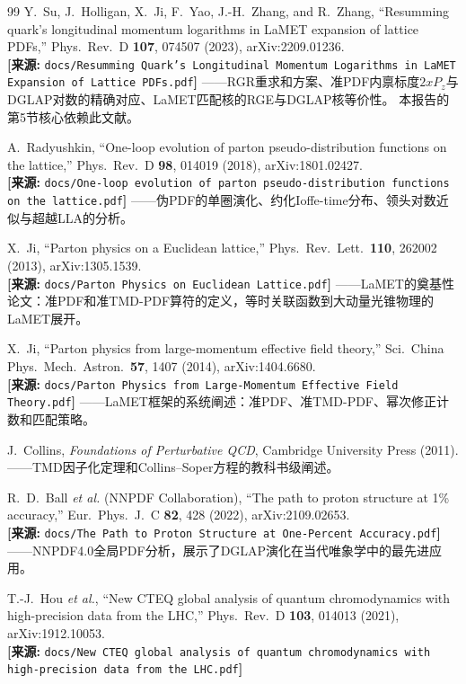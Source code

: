 \documentclass[12pt,a4paper]{ctexart}
\theoremstyle{definition}
\begin{document}
\begin{thebibliography}{99}
Y.~Su, J.~Holligan, X.~Ji, F.~Yao, J.-H.~Zhang, and R.~Zhang,
``Resumming quark's longitudinal momentum logarithms in LaMET expansion of lattice PDFs,''
Phys.\ Rev.\ D \textbf{107}, 074507 (2023), arXiv:2209.01236.
\\\textbf{[来源:} \texttt{docs/Resumming Quark's Longitudinal Momentum Logarithms in LaMET Expansion of Lattice PDFs.pdf}\textbf{]}
——RGR重求和方案、准PDF内禀标度$2xP_z$与DGLAP对数的精确对应、LaMET匹配核的RGE与DGLAP核等价性。
本报告的第5节核心依赖此文献。

A.~Radyushkin,
``One-loop evolution of parton pseudo-distribution functions on the lattice,''
Phys.\ Rev.\ D \textbf{98}, 014019 (2018), arXiv:1801.02427.
\\\textbf{[来源:} \texttt{docs/One-loop evolution of parton pseudo-distribution functions on the lattice.pdf}\textbf{]}
——伪PDF的单圈演化、约化Ioffe-time分布、领头对数近似与超越LLA的分析。

X.~Ji,
``Parton physics on a Euclidean lattice,''
Phys.\ Rev.\ Lett.\ \textbf{110}, 262002 (2013), arXiv:1305.1539.
\\\textbf{[来源:} \texttt{docs/Parton Physics on Euclidean Lattice.pdf}\textbf{]}
——LaMET的奠基性论文：准PDF和准TMD-PDF算符的定义，等时关联函数到大动量光锥物理的LaMET展开。

X.~Ji,
``Parton physics from large-momentum effective field theory,''
Sci.\ China Phys.\ Mech.\ Astron.\ \textbf{57}, 1407 (2014), arXiv:1404.6680.
\\\textbf{[来源:} \texttt{docs/Parton Physics from Large-Momentum Effective Field Theory.pdf}\textbf{]}
——LaMET框架的系统阐述：准PDF、准TMD-PDF、幂次修正计数和匹配策略。

J.~Collins,
\textit{Foundations of Perturbative QCD},
Cambridge University Press (2011).
——TMD因子化定理和Collins--Soper方程的教科书级阐述。

R.~D.~Ball \textit{et al.} (NNPDF Collaboration),
``The path to proton structure at 1\% accuracy,''
Eur.\ Phys.\ J.\ C \textbf{82}, 428 (2022), arXiv:2109.02653.
\\\textbf{[来源:} \texttt{docs/The Path to Proton Structure at One-Percent Accuracy.pdf}\textbf{]}
——NNPDF4.0全局PDF分析，展示了DGLAP演化在当代唯象学中的最先进应用。

T.-J.~Hou \textit{et al.},
``New CTEQ global analysis of quantum chromodynamics with high-precision data from the LHC,''
Phys.\ Rev.\ D \textbf{103}, 014013 (2021), arXiv:1912.10053.
\\\textbf{[来源:} \texttt{docs/New CTEQ global analysis of quantum chromodynamics with high-precision data from the LHC.pdf}\textbf{]}


\end{thebibliography}
\end{document}
